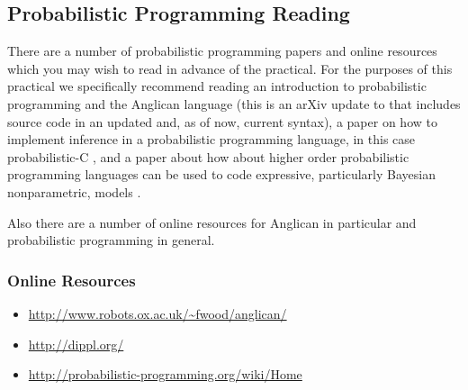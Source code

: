 \documentclass{article}
\begin{document}
\subsection{Probabilistic Programming Reading}

There are a number of probabilistic programming papers and online resources which you 
may wish to read in advance of the practical.  For the purposes of this practical we
specifically recommend reading an introduction to probabilistic programming and the Anglican language \cite{Wood-AISTATS-2014-arXiv-syntax-update-2015} (this is an arXiv update to \cite{Wood-AISTATS-2014} that includes source code in an updated and, as of now, current syntax), a paper on how to implement inference in a probabilistic programming language, in this case probabilistic-C \cite{Paige-ICML-2014}, and a paper about how about higher order probabilistic programming languages can be used to code expressive, particularly Bayesian nonparametric, models \cite{goodman2008church}.

Also there are a number of online resources for Anglican in particular and
probabilistic programming in general.  

\subsubsection{Online Resources}
\begin{itemize}
\item \url{http://www.robots.ox.ac.uk/~fwood/anglican/}
\item \url{http://dippl.org/}
\item \url{http://probabilistic-programming.org/wiki/Home}
\end{itemize}

  

\end{document}
